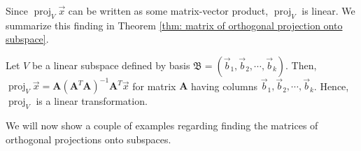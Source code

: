 \documentclass[]{book}
\DeclareMathOperator{\proj}{proj}
\newcommand{\bas}[1]{\ensuremath{\mathfrak{#1}}}
\newcommand{\mat}[1]{\ensuremath{\mathbf{#1}}}
\begin{document}
Since $\proj_V\vec{x}$ can be written as some matrix-vector product, $\proj_V$ is linear. We summarize this finding in Theorem \ref{thm: matrix of orthogonal projection onto subspace}.

\begin{theorem}
    \label{thm: matrix of orthogonal projection onto subspace}
    Let $V$ be a linear subspace defined by basis $\bas{B} = \left(\vec{b}_1,\vec{b}_2,\cdots,\vec{b}_k\right)$. Then, 
    $\proj_V \vec{x} = \mat{A}\left(\mat{A}^T\mat{A}\right)^{-1}\mat{A}^T\vec{x}$ for matrix $\mat{A}$ having columns $\vec{b}_1,\vec{b}_2,\cdots,\vec{b}_k$. Hence, $\proj_V$ is a linear transformation.
\end{theorem}

We will now show a couple of examples regarding finding the matrices of orthogonal projections onto subspaces.
\end{document}
